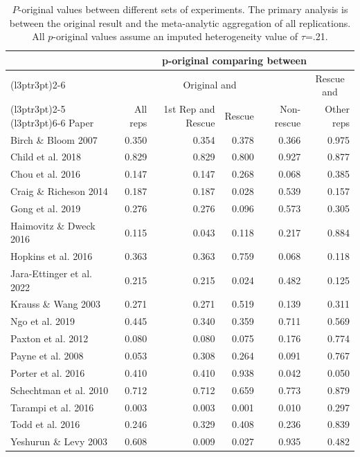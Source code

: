 \documentclass[
  english,
  a4paper,
]{article}
\begin{document}
\begin{table}

\caption{\label{tab:tab-porig}$P$-original values between different sets of experiments. The primary analysis is between the original result and the meta-analytic aggregation of all replications. All $p$-original values assume an imputed heterogeneity value of $\tau$=.21.}
\centering
\begin{tabular}[t]{lrrrrr}
\toprule
\multicolumn{1}{c}{ } & \multicolumn{5}{c}{p-original comparing between} \\
\cmidrule(l{3pt}r{3pt}){2-6}
\multicolumn{1}{c}{ } & \multicolumn{4}{c}{Original and} & \multicolumn{1}{c}{Rescue and} \\
\cmidrule(l{3pt}r{3pt}){2-5} \cmidrule(l{3pt}r{3pt}){6-6}
Paper & All reps & 1st Rep and Rescue & Rescue & Non-rescue & Other reps\\
\midrule
Birch \& Bloom 2007 & 0.350 & 0.354 & 0.378 & 0.366 & 0.975\\
Child et al. 2018 & 0.829 & 0.829 & 0.800 & 0.927 & 0.877\\
Chou et al. 2016 & 0.147 & 0.147 & 0.268 & 0.068 & 0.385\\
Craig \& Richeson 2014 & 0.187 & 0.187 & 0.028 & 0.539 & 0.157\\
Gong et al. 2019 & 0.276 & 0.276 & 0.096 & 0.573 & 0.305\\
Haimovitz \& Dweck 2016 & 0.115 & 0.043 & 0.118 & 0.217 & 0.884\\
Hopkins et al. 2016 & 0.363 & 0.363 & 0.759 & 0.068 & 0.118\\
Jara-Ettinger et al. 2022 & 0.215 & 0.215 & 0.024 & 0.482 & 0.125\\
Krauss \& Wang 2003 & 0.271 & 0.271 & 0.519 & 0.139 & 0.311\\
Ngo et al. 2019 & 0.445 & 0.340 & 0.359 & 0.711 & 0.569\\
Paxton et al. 2012 & 0.080 & 0.080 & 0.075 & 0.176 & 0.774\\
Payne et al. 2008 & 0.053 & 0.308 & 0.264 & 0.091 & 0.767\\
Porter et al. 2016 & 0.410 & 0.410 & 0.938 & 0.042 & 0.050\\
Schechtman et al. 2010 & 0.712 & 0.712 & 0.659 & 0.773 & 0.879\\
Tarampi et al. 2016 & 0.003 & 0.003 & 0.001 & 0.010 & 0.297\\
Todd et al. 2016 & 0.246 & 0.329 & 0.408 & 0.236 & 0.839\\
Yeshurun \& Levy 2003 & 0.608 & 0.009 & 0.027 & 0.935 & 0.482\\
\bottomrule
\end{tabular}
\end{table}
\end{document}
